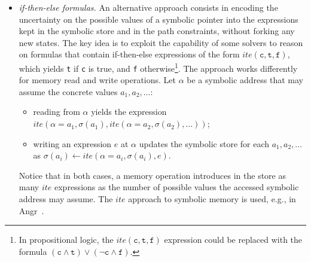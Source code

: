 \begin{itemize}
\item {\em if-then-else formulas.} An alternative approach consists in encoding the uncertainty on the possible values of a symbolic pointer into the expressions kept in the symbolic store and in the path constraints, without forking any new states. The key idea is to exploit the capability of some solvers to reason on formulas that contain if-then-else expressions of the form $ite(\texttt{c}, \texttt{t}, \texttt{f})$, which yields \texttt{t} if \texttt{c} is true, and \texttt{f} otherwise\footnote{In propositional logic, the $ite(\texttt{c}, \texttt{t}, \texttt{f})$ expression could be replaced with the formula $(\texttt{c} \wedge \texttt{t}) \vee (\neg\texttt{c} \wedge \texttt{f})$.}.
The approach works differently for memory read and write operations. Let $\alpha$ be a symbolic address that may assume the concrete values $a_1, a_2, \ldots$:
\begin{itemize}
\item reading from $\alpha$ yields the expression $ite(\alpha=a_1,\sigma(a_1), ite(\alpha=a_2,\sigma(a_2), \ldots))$;
\item writing an expression $e$ at $\alpha$ updates the symbolic store for each $a_1, a_2, \ldots$ as $\sigma(a_i)\gets ite(\alpha=a_i,\sigma(a_i),e)$.
\end{itemize}
Notice that in both cases, a memory operation introduces in the store as many $ite$ expressions as the number of possible values the accessed symbolic address may assume. The $ite$ approach to symbolic memory is used, e.g., in {\sc Angr}~\cite{ANGR-SSP16}.


\end{itemize}
